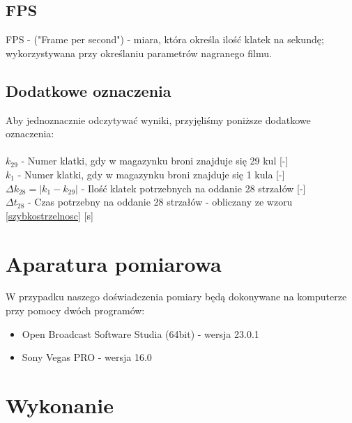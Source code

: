 \documentclass[a4paper,12pt]{article}
\begin{document}
\begin{justify}
\subsection{FPS}
FPS - ("Frame per second") - miara, która określa ilość klatek na sekundę; wykorzystywana przy określaniu parametrów nagranego filmu.

\subsection{Dodatkowe oznaczenia}
Aby jednoznacznie odczytywać wyniki, przyjęliśmy poniższe dodatkowe oznaczenia: \\ \, \\
$ k_{29} $ - Numer klatki, gdy w magazynku broni znajduje się 29 kul [-] \\
$ k_{1} $	-  Numer klatki, gdy w magazynku broni znajduje się 1 kula [-] \\
$ \Delta k_{28} = | k_{1} - k_{29} | $ - Ilość klatek potrzebnych na oddanie 28 strzałów [-] \\
$ \Delta t_{28} $ - Czas potrzebny na oddanie 28 strzałów - obliczany ze wzoru \ref{szybkostrzelnosc} [s]

\section{Aparatura pomiarowa}

W przypadku naszego doświadczenia pomiary będą dokonywane na komputerze przy pomocy dwóch programów:
\begin{itemize}
\item Open Broadcast Software Studia (64bit) - wersja 23.0.1
\item Sony Vegas PRO - wersja 16.0
\end{itemize}

\section{Wykonanie}


\end{justify}
\end{document}
